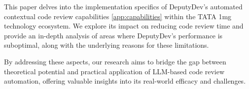 This paper delves into the implementation specifics of DeputyDev's automated contextual code review capabilities \ref{app:capabilities} within the TATA 1mg technology ecosystem. We explore its impact on reducing code review time and provide an in-depth analysis of areas where DeputyDev's performance is suboptimal, along with the underlying reasons for these limitations.

By addressing these aspects, our research aims to bridge the gap between theoretical potential and practical application of LLM-based code review automation, offering valuable insights into its real-world efficacy and challenges.